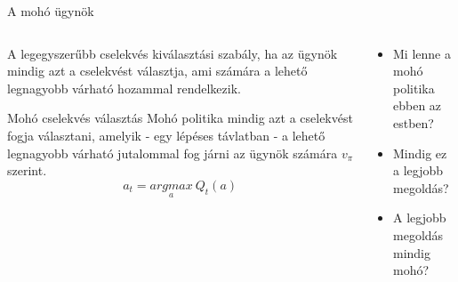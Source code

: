 \documentclass[english, aspectratio=169]{beamer}
\begin{document}
\begin{frame}{A mohó ügynök}
\begin{columns}[T]
\begin{column}{.5\textwidth}
A legegyszerűbb cselekvés kiválasztási szabály, ha az ügynök mindig azt a cselekvést választja, ami számára a lehető legnagyobb várható hozammal rendelkezik.
\begin{center}
\begin{block}{Mohó cselekvés választás}
Mohó politika mindig azt a cselekvést fogja választani, amelyik - egy lépéses távlatban - a lehető legnagyobb várható jutalommal fog járni az ügynök számára $v_{\pi}$ szerint.
\[
a_{t}=\underset{a}{argmax}\:Q_{t}(a)
\]
\end{block}
\end{center}
\end{column}
\begin{column}{.5\textwidth}
\begin{itemize}
	\item Mi lenne a mohó politika ebben az estben?
	\item Mindig ez a legjobb megoldás?
	\item A legjobb megoldás mindig mohó?
\end{itemize}
\begin{center}
\end{center}
\end{column}
\end{columns}
\end{frame}
\end{document}

